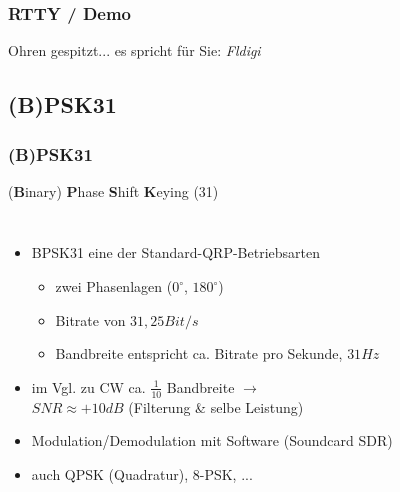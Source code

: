 \begin{frame}
    \frametitle{RTTY / Demo}

    \Large{Ohren gespitzt... es spricht für Sie: \emph{Fldigi}}

\end{frame}

 
\subsection{(B)PSK31}

\begin{frame}
    \frametitle{(B)PSK31}
 
    (\textbf{B}inary) \textbf{P}hase \textbf{S}hift \textbf{K}eying (31)

    \begin{columns}[c]
        \column[c]{8cm}
            \begin{itemize}
                \item BPSK31 eine der Standard-QRP-Betriebsarten
                \begin{itemize}
                    \item zwei Phasenlagen ($0^{\circ}$, $180^{\circ}$)
                    \item Bitrate von $31,25 Bit/s$
                    \item Bandbreite entspricht ca. Bitrate pro Sekunde, $31Hz$
                \end{itemize}
                \item im Vgl. zu CW ca. $\frac{1}{10}$ Bandbreite $\rightarrow$ \\
                      $SNR \approx +10dB$ (Filterung \& selbe Leistung)
                \item Modulation/Demodulation mit Software (Soundcard SDR)
                \item auch QPSK (Quadratur), 8-PSK, ...
            \end{itemize}
        \column{2cm}
        \begin{center}

\end{center}
\end{columns}
\end{frame}
